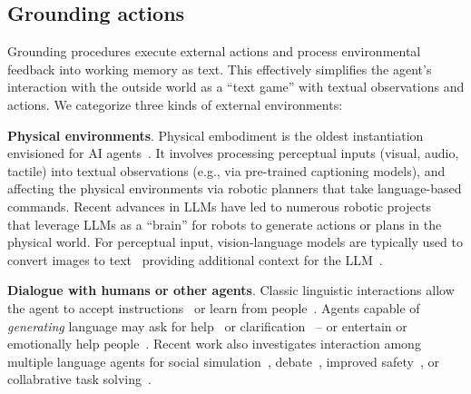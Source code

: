 \documentclass[10pt]{article} %
\begin{document}
\subsection{Grounding actions} \label{sec:grounding}
Grounding procedures execute external actions and process environmental feedback into working memory as text. This effectively simplifies the agent's interaction with the outside world as a ``text game'' with textual observations and actions. We categorize three kinds of external environments:

\textbf{Physical environments}. Physical embodiment is the oldest instantiation envisioned for AI agents~\citep{Nilsson1984ShakeyTR}. It involves processing perceptual inputs (visual, audio, tactile) into textual observations (e.g., via pre-trained captioning models), and affecting the physical environments via robotic planners that take language-based commands. Recent advances in LLMs have led to numerous robotic projects~\citep{ahn2022can, liang2023code, singh2023progprompt, palo2023towards, ren2023robots} that leverage LLMs as a ``brain'' for robots to generate actions or plans in the physical world. For perceptual input, vision-language models are typically used 
to convert images to text~\citep{alayrac2022flamingo, sumers2023distilling} providing additional context for the LLM~\citep{driess2023palm, huang2023instruct2act, brohan2022rt, brohan2023rt}.

\textbf{Dialogue with humans or other agents}. Classic linguistic interactions allow the agent to accept instructions~\citep{winograd1972understanding, tellex2011understanding, chen2011learning, bisk2016towards} or learn from people~\citep{nguyen2021interactive, sumers2022talk, sumers2021learning, wang2016learning}. Agents capable of \emph{generating} language may ask for help~\citep{ren2023robots, nguyen2022framework, nguyen2019vision, nguyen2019help} or clarification~\citep{biyik2019asking, sadigh2017active, padmakumar2022teach, thomason2020vision, narayanchen2019collaborative} -- or entertain or emotionally help people~\citep{zhang2020dialogpt, zhou2018emotional, pataranutaporn2021ai, hasan2023sapien, ma2023understanding}. Recent work also investigates interaction among multiple language agents for social simulation~\citep{park2023generative, jinxin2023cgmi, gao2023s}, debate~\citep{chan2023chateval, liang2023encouraging, du2023improving}, improved safety~\citep{irving2018ai}, or collabrative task solving~\citep{qian2023communicative, wu2023autogen, hong2023metagpt, dong2023self}.
\end{document}
